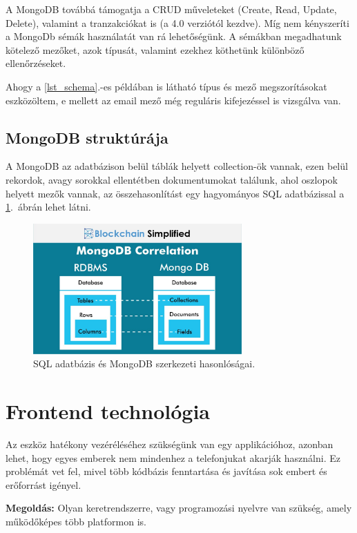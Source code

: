 \documentclass{thesis-ekf}
\theoremstyle{definition}
\theoremstyle{remark}
\begin{document}
	A MongoDB továbbá támogatja a CRUD műveleteket (Create, Read, Update, Delete), valamint a tranzakciókat is (a 4.0 verziótól kezdve).\cite{bib_mongo_sql}
	Míg nem kényszeríti a MongoDb sémák használatát van rá lehetőségünk. A sémákban megadhatunk kötelező mezőket, azok típusát, valamint ezekhez köthetünk különböző ellenőrzéseket.
	
	
	Ahogy a \ref{lst_schema}.-es példában is látható típus és mező megszorításokat eszközöltem, e mellett az email mező még reguláris kifejezéssel is vizsgálva van.
	\subsection{MongoDB struktúrája}
	A MongoDB az adatbázison belül táblák helyett collection-ök vannak, ezen belül rekordok, avagy sorokkal ellentétben dokumentumokat találunk, ahol oszlopok helyett mezők vannak, az összehasonlítást egy hagyományos SQL adatbázissal a \ref{img_sql_mongo}.~ábrán lehet látni. \cite{bib_mongo_sql}
	 \begin{figure}[!h]
	 	\centering
	 	\includegraphics[width=8cm]{mongo_vs_sql}
	 	\caption{SQL adatbázis és MongoDB szerkezeti hasonlóságai.}
	 	\label{img_sql_mongo}
	 \end{figure}
	\section{Frontend technológia}
	Az eszköz hatékony vezéréléséhez szükségünk van egy applikációhoz, azonban lehet, hogy egyes emberek nem mindenhez a telefonjukat akarják használni. Ez problémát vet fel, mivel több kódbázis fenntartása és javítása sok embert és erőforrást igényel. 
	
	\textbf{Megoldás:} Olyan keretrendszerre, vagy programozási nyelvre van szükség, amely működőképes több platformon is.
	
\end{document}

